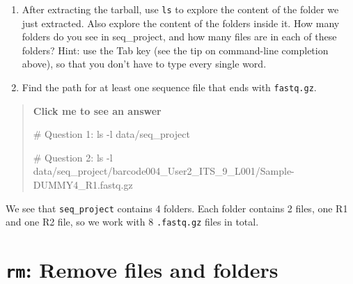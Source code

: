 \documentclass[
  letterpaper,
  DIV=11,
  numbers=noendperiod]{scrreprt}
\newenvironment{Shaded}{}{}
\newcommand{\AttributeTok}[1]{\textcolor[rgb]{0.84,0.23,0.29}{#1}}
\newcommand{\CommentTok}[1]{\textcolor[rgb]{0.42,0.45,0.49}{#1}}
\newcommand{\FunctionTok}[1]{\textcolor[rgb]{0.44,0.26,0.76}{#1}}
\newcommand{\NormalTok}[1]{\textcolor[rgb]{0.14,0.16,0.18}{#1}}
\providecommand{\tightlist}{%
  \setlength{\itemsep}{0pt}\setlength{\parskip}{0pt}}
\begin{document}
\begin{tcolorbox}[enhanced jigsaw, coltitle=black, breakable, titlerule=0mm, colback=white, rightrule=.15mm, bottomrule=.15mm, toprule=.15mm, colframe=quarto-callout-color-frame, colbacktitle=quarto-callout-color!10!white, bottomtitle=1mm, opacitybacktitle=0.6, toptitle=1mm, leftrule=.75mm, arc=.35mm, title=\textcolor{quarto-callout-color}{\faInfo}\hspace{0.5em}{Exercise}, left=2mm, opacityback=0]

\begin{enumerate}
\def\labelenumi{\arabic{enumi}.}
\tightlist
\item
  After extracting the tarball, use \texttt{ls} to explore the content
  of the folder we just extracted. Also explore the content of the
  folders inside it. How many folders do you see in seq\_project, and
  how many files are in each of these folders? Hint: use the Tab key
  (see the tip on command-line completion above), so that you don't have
  to type every single word.
\item
  Find the path for at least one sequence file that ends with
  \texttt{fastq.gz}.
\end{enumerate}

\begin{quote}
\textbf{Click me to see an answer}

\begin{Shaded}
\begin{Highlighting}[]
\CommentTok{\# Question 1:}
\FunctionTok{ls} \AttributeTok{{-}l}\NormalTok{ data/seq\_project}

\CommentTok{\# Question 2:}
\FunctionTok{ls} \AttributeTok{{-}l}\NormalTok{ data/seq\_project/barcode004\_User2\_ITS\_9\_L001/Sample{-}DUMMY4\_R1.fastq.gz}
\end{Highlighting}
\end{Shaded}
\end{quote}

We see that \texttt{seq\_project} contains 4 folders. Each folder
contains 2 files, one R1 and one R2 file, so we work with 8
\texttt{.fastq.gz} files in total.

\end{tcolorbox}

\section{\texorpdfstring{\texttt{rm}: Remove files and
folders}{rm: Remove files and folders}}\label{rm-remove-files-and-folders}
\end{document}
